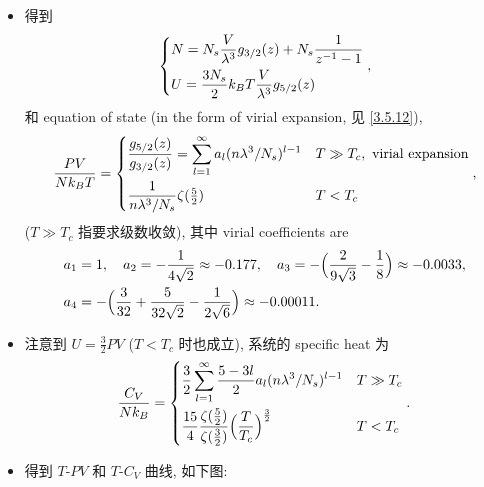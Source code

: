 \begin{itemize}
	\item 得到
	\begin{equation}
		\begin{dcases}
			N = N_s \frac{V}{\lambda^3} g_{3 / 2}(z) + N_s \frac{1}{z^{- 1} - 1} \\
			U = \frac{3 N_s}{2} k_B T \frac{V}{\lambda^3} g_{5 / 2}(z)
		\end{dcases},
	\end{equation}
	和 equation of state (in the form of virial expansion, 见 \eqref{3.5.12}),
	\begin{equation}
		\frac{P V}{N k_B T} = \begin{dcases}
			\frac{g_{5 / 2}(z)}{g_{3 / 2}(z)} = \sum_{l = 1}^\infty a_l (n \lambda^3 / N_s)^{l - 1} & T \gg T_c, \ \text{virial expansion} \\
			\frac{1}{n \lambda^3 / N_s} \zeta({\textstyle \frac{5}{2}}) & T < T_c
		\end{dcases},
	\end{equation}
	($T \gg T_c$ 指要求级数收敛), 其中 virial coefficients are
	\begin{align}
		& a_1 = 1, \quad a_2 = - \frac{1}{4 \sqrt{2}} \approx - 0.177, \quad a_3 = - \Big( \frac{2}{9 \sqrt{3}} - \frac{1}{8} \Big) \approx - 0.0033, \notag \\
		& a_4 = - \Big( \frac{3}{32} + \frac{5}{32 \sqrt{2}} - \frac{1}{2 \sqrt{6}} \Big) \approx - 0.00011.
	\end{align}
	
	\item 注意到 $U = \frac{3}{2} P V$ ($T < T_c$ 时也成立), 系统的 specific heat 为
	\begin{equation}
		\frac{C_V}{N k_B} = \begin{dcases}
			\frac{3}{2} \sum_{l = 1}^\infty \frac{5 - 3 l}{2} a_l (n \lambda^3 / N_s)^{l - 1} & T \gg T_c \\
			\frac{15}{4} \frac{\zeta({\textstyle \frac{5}{2}})}{\zeta({\textstyle \frac{3}{2}})} \Big( \frac{T}{T_c} \Big)^{\frac{3}{2}} & T < T_c
		\end{dcases}.
	\end{equation}
	
	\item 得到 $T$-$P V$ 和 $T$-$C_V$ 曲线, 如下图:
	

\end{itemize}
